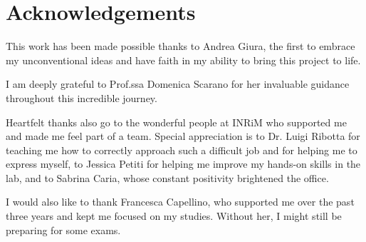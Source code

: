 \documentclass[12pt]{report} %
\begin{document}
% 



\newpage

\section*{Acknowledgements}

\noindent This work has been made possible thanks to Andrea Giura, the first to embrace my unconventional ideas and have faith in my ability to bring this project to life.
\vspace{10pt}

\noindent I am deeply grateful to Prof.ssa Domenica Scarano for her invaluable guidance throughout this incredible journey.
\vspace{10pt}

\noindent Heartfelt thanks also go to the wonderful people at INRiM who supported me and made me feel part of a team. Special appreciation is to Dr. Luigi Ribotta for teaching me how to correctly approach such a difficult job and for helping me to express myself, to Jessica Petiti for helping me improve my hands-on skills in the lab, and to Sabrina Caria, whose constant positivity brightened the office.
\vspace{10pt}

\noindent I would also like to thank Francesca Capellino, who supported me over the past three years and kept me focused on my studies. Without her, I might still be preparing for some exams.

\setcounter{page}{0}
\tableofcontents

\setcounter{page}{0}
\newpage








\fontsize{10}{12}\selectfont


  
\end{document}
